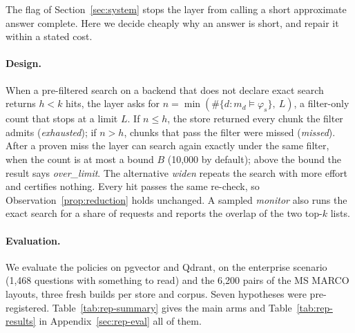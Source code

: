 
The flag of Section~\ref{sec:system} stops the layer from calling a short approximate answer complete. Here we decide
cheaply why an answer is short, and repair it within a stated cost.

\paragraph{Design.}
When a pre-filtered search on a backend that does not declare exact search returns $h < k$ hits, the layer asks for
$n = \min(\#\{d : m_d \models \varphi_s\},\ L)$, a filter-only count that stops at a limit $L$. If $n \le h$, the store
returned every chunk the filter admits (\emph{exhausted}); if $n > h$, chunks that pass the filter were missed
(\emph{missed}). After a proven miss the layer can search again exactly under the same filter, when the count is at
most a bound $B$ (10,000 by default); above the bound the result says \emph{over\_limit}. The
alternative \emph{widen} repeats the search with more effort and certifies nothing. Every hit passes the same
re-check, so Observation~\ref{prop:reduction} holds unchanged. A sampled
\emph{monitor} also runs the exact search for a share of requests and reports the overlap of the two top-$k$
lists.

\paragraph{Evaluation.}
We evaluate the policies on pgvector and Qdrant, on the enterprise scenario (1,468 questions with something to read) and the
6,200 pairs of the MS MARCO layouts, three fresh builds per store and corpus. Seven hypotheses were pre-registered.
Table~\ref{tab:rep-summary} gives the main arms and Table~\ref{tab:rep-results} in Appendix~\ref{sec:rep-eval} all of them.


